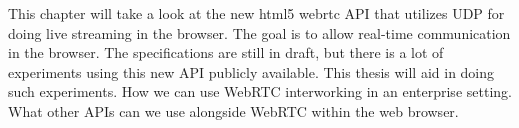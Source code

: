 This chapter will take a look at the new \ac{html5} \ac{webrtc} API that utilizes UDP for doing live streaming in the browser. The goal is to allow real-time communication in the browser. The specifications are still in draft, but there is a lot of experiments using this new API publicly available. This thesis will aid in doing such experiments. How we can use WebRTC interworking in an enterprise setting. What other APIs can we use alongside WebRTC within the web browser.

